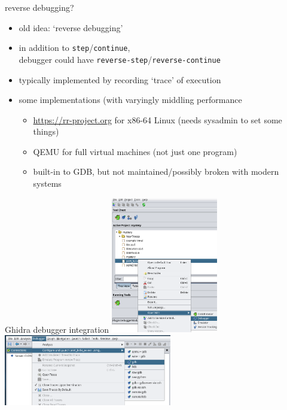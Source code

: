 \begin{frame}{reverse debugging?}
    \begin{itemize}
    \item old idea: `reverse debugging'
    \item in addition to \texttt{step}/\texttt{continue}, \\
        debugger could have \texttt{reverse-step}/\texttt{reverse-continue}
    \item typically implemented by recording `trace' of execution
    \vspace{.5cm}
    \item some implementations (with varyingly middling performance
        \begin{itemize}
        \item \url{https://rr-project.org} for x86-64 Linux (needs sysadmin to set some things)
        \item QEMU for full virtual machines (not just one program)
        \item built-in to GDB, but not maintained/possibly broken with modern systems
        \end{itemize}
    \end{itemize}
\end{frame}

\begin{frame}{Ghidra debugger integration}
\includegraphics[width=0.35\textwidth]{../re-tools/ghidra-open-debugger.png}
\includegraphics[width=0.55\textwidth]{../re-tools/ghidra-open-debugger2.png}
\end{frame}

